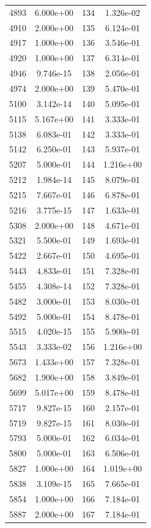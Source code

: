 \documentclass[12pt]{article}
\begin{document}
\begin{longtable}{@{}cccc@{}}
4893 & 6.000e+00 & 134 & 1.326e-02 \\
4910 & 2.000e+00 & 135 & 6.124e-01 \\
4917 & 1.000e+00 & 136 & 3.546e-01 \\
4920 & 1.000e+00 & 137 & 6.314e-01 \\
4946 & 9.746e-15 & 138 & 2.056e-01 \\
4974 & 2.000e+00 & 139 & 5.470e-01 \\
5100 & 3.142e-14 & 140 & 5.095e-01 \\
5115 & 5.167e+00 & 141 & 3.333e-01 \\
5138 & 6.083e-01 & 142 & 3.333e-01 \\
5142 & 6.250e-01 & 143 & 5.937e-01 \\
5207 & 5.000e-01 & 144 & 1.216e+00 \\
5212 & 1.984e-14 & 145 & 8.079e-01 \\
5215 & 7.667e-01 & 146 & 6.878e-01 \\
5216 & 3.775e-15 & 147 & 1.633e-01 \\
5308 & 2.000e+00 & 148 & 4.671e-01 \\
5321 & 5.500e-01 & 149 & 1.693e-01 \\
5422 & 2.667e-01 & 150 & 4.695e-01 \\
5443 & 4.833e-01 & 151 & 7.328e-01 \\
5455 & 4.308e-14 & 152 & 7.328e-01 \\
5482 & 3.000e-01 & 153 & 8.030e-01 \\
5492 & 5.000e-01 & 154 & 8.478e-01 \\
5515 & 4.020e-15 & 155 & 5.900e-01 \\
5543 & 3.333e-02 & 156 & 1.216e+00 \\
5673 & 1.433e+00 & 157 & 7.328e-01 \\
5682 & 1.900e+00 & 158 & 3.849e-01 \\
5699 & 5.017e+00 & 159 & 8.478e-01 \\
5717 & 9.827e-15 & 160 & 2.157e-01 \\
5719 & 9.827e-15 & 161 & 8.030e-01 \\
5793 & 5.000e-01 & 162 & 6.034e-01 \\
5800 & 5.000e-01 & 163 & 6.506e-01 \\
5827 & 1.000e+00 & 164 & 1.019e+00 \\
5838 & 3.109e-15 & 165 & 7.665e-01 \\
5854 & 1.000e+00 & 166 & 7.184e-01 \\
5887 & 2.000e+00 & 167 & 7.184e-01 \\

\end{longtable}
\end{document}
